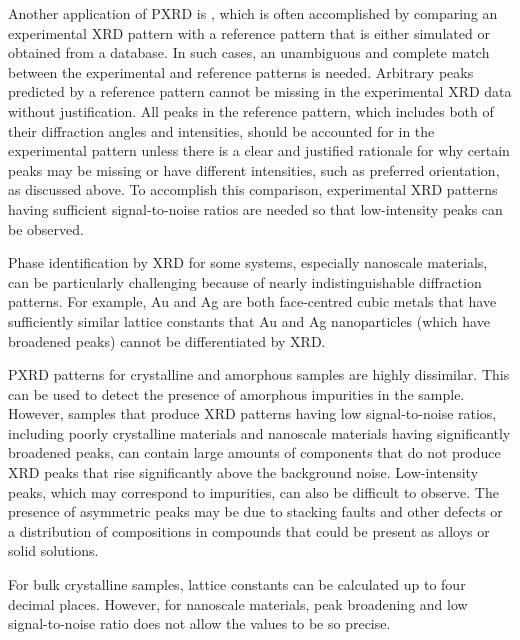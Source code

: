 Another application of PXRD is , which is often accomplished by comparing an experimental XRD pattern with a reference pattern that is either simulated or obtained from a database. In such cases, an unambiguous and complete match between the experimental and reference patterns is needed. Arbitrary peaks predicted by a reference pattern cannot be missing in the experimental XRD data without justification. All peaks in the reference pattern, which includes both of their diffraction angles and intensities, should be accounted for in the experimental pattern unless there is a clear and justified rationale for why certain peaks may be missing or have different intensities, such as preferred orientation, as discussed above. To accomplish this comparison, experimental XRD patterns having sufficient signal-to-noise ratios are needed so that low-intensity peaks can be observed.

Phase identification by XRD for some systems, especially nanoscale materials, can be particularly challenging because of nearly indistinguishable diffraction patterns. For example, Au and Ag are both face-centred cubic metals that have sufficiently similar lattice constants that Au and Ag nanoparticles (which have broadened peaks) cannot be differentiated by XRD.

PXRD patterns for crystalline and amorphous samples are highly dissimilar. This can be used to detect the presence of amorphous impurities in the sample. However, samples that produce XRD patterns having low signal-to-noise ratios, including poorly crystalline materials and nanoscale materials having significantly broadened peaks, can contain large amounts of components that do not produce XRD peaks that rise significantly above the background noise. Low-intensity peaks, which may correspond to impurities, can also be difficult to observe. The presence of asymmetric peaks may be due to stacking faults and other defects or a distribution of compositions in compounds that could be present as alloys or solid solutions.

For bulk crystalline samples, lattice constants can be calculated up to four decimal places. However, for nanoscale materials, peak broadening and low signal-to-noise ratio does not allow the values to be so precise.
